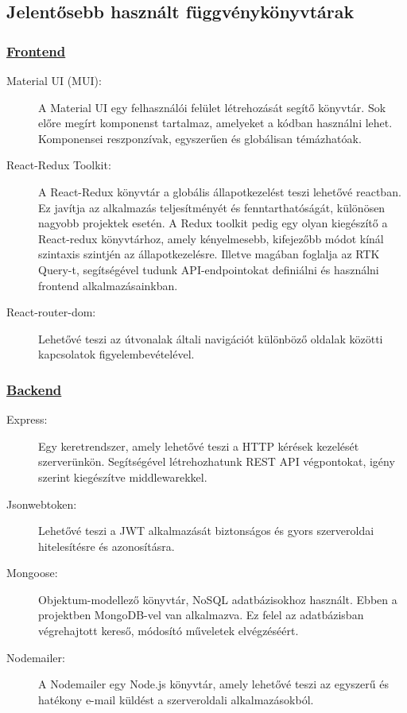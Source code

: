 \subsection{Jelentősebb használt függvénykönyvtárak}

\subsubsection{\underline{Frontend}}

\begin{description}
	\item[Material UI (MUI): \cite{materialui}] A Material UI egy felhasználói felület létrehozását segítő könyvtár. Sok előre megírt komponenst tartalmaz, amelyeket a kódban használni lehet. Komponensei reszponzívak, egyszerűen és globálisan témázhatóak.
	\item[React-Redux Toolkit: \cite{reactredux}] A React-Redux könyvtár a globális állapotkezelést teszi lehetővé reactban. Ez javítja az alkalmazás teljesítményét és fenntarthatóságát, különösen nagyobb projektek esetén. A Redux toolkit pedig egy olyan kiegészítő a React-redux könyvtárhoz, amely kényelmesebb, kifejezőbb módot kínál szintaxis szintjén az állapotkezelésre. Illetve magában foglalja az RTK Query-t, segítségével tudunk API-endpointokat definiálni és használni frontend alkalmazásainkban. 
	\item[React-router-dom: \cite{reactrouterdom}] Lehetővé teszi az útvonalak általi navigációt különböző oldalak közötti kapcsolatok figyelembevételével.
\end{description}

\subsubsection{\underline{Backend}}
\begin{description}
	\item[Express: \cite{express}] Egy keretrendszer, amely lehetővé teszi a HTTP kérések kezelését szerverünkön. Segítségével létrehozhatunk REST API végpontokat, igény szerint kiegészítve middlewarekkel.
	\item[Jsonwebtoken: \cite{jsonwebtoken}] Lehetővé teszi a JWT alkalmazását biztonságos és gyors szerveroldai hitelesítésre és azonosításra.
	\item[Mongoose: \cite{mongoose}] Objektum-modellező könyvtár, NoSQL adatbázisokhoz használt. Ebben a projektben MongoDB-vel van alkalmazva. Ez felel az adatbázisban végrehajtott kereső, módosító műveletek elvégzéséért.
	\item[Nodemailer: \cite{nodemailer}] A Nodemailer egy Node.js könyvtár, amely lehetővé teszi az egyszerű és hatékony e-mail küldést a szerveroldali alkalmazásokból.
\end{description}

